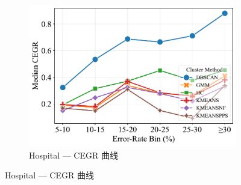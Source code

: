 \documentclass[10pt]{article} %
\numberwithin{equation}{section}
\begin{document}
\begin{figure}[htbp]
\begin{subfigure}[b]{0.33\linewidth}
    \includegraphics[width=\linewidth]{figures/6.4.3graph/CEGR_5pct_hospital.pdf}
    \caption{Hospital — CEGR 曲线}
    \label{fig:ho_cegr}
  \end{subfigure}


\end{figure}
\end{document}
